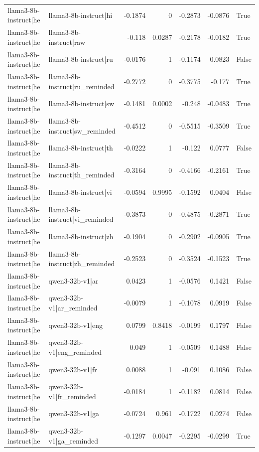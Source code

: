 \begin{table}
\begin{tabular}{l l r r r r l}
llama3-8b-instruct|he & llama3-8b-instruct|hi & -0.1874 & 0 & -0.2873 & -0.0876 & True \\
llama3-8b-instruct|he & llama3-8b-instruct|raw & -0.118 & 0.0287 & -0.2178 & -0.0182 & True \\
llama3-8b-instruct|he & llama3-8b-instruct|ru & -0.0176 & 1 & -0.1174 & 0.0823 & False \\
llama3-8b-instruct|he & llama3-8b-instruct|ru_reminded & -0.2772 & 0 & -0.3775 & -0.177 & True \\
llama3-8b-instruct|he & llama3-8b-instruct|sw & -0.1481 & 0.0002 & -0.248 & -0.0483 & True \\
llama3-8b-instruct|he & llama3-8b-instruct|sw_reminded & -0.4512 & 0 & -0.5515 & -0.3509 & True \\
llama3-8b-instruct|he & llama3-8b-instruct|th & -0.0222 & 1 & -0.122 & 0.0777 & False \\
llama3-8b-instruct|he & llama3-8b-instruct|th_reminded & -0.3164 & 0 & -0.4166 & -0.2161 & True \\
llama3-8b-instruct|he & llama3-8b-instruct|vi & -0.0594 & 0.9995 & -0.1592 & 0.0404 & False \\
llama3-8b-instruct|he & llama3-8b-instruct|vi_reminded & -0.3873 & 0 & -0.4875 & -0.2871 & True \\
llama3-8b-instruct|he & llama3-8b-instruct|zh & -0.1904 & 0 & -0.2902 & -0.0905 & True \\
llama3-8b-instruct|he & llama3-8b-instruct|zh_reminded & -0.2523 & 0 & -0.3524 & -0.1523 & True \\
llama3-8b-instruct|he & qwen3-32b-v1|ar & 0.0423 & 1 & -0.0576 & 0.1421 & False \\
llama3-8b-instruct|he & qwen3-32b-v1|ar_reminded & -0.0079 & 1 & -0.1078 & 0.0919 & False \\
llama3-8b-instruct|he & qwen3-32b-v1|eng & 0.0799 & 0.8418 & -0.0199 & 0.1797 & False \\
llama3-8b-instruct|he & qwen3-32b-v1|eng_reminded & 0.049 & 1 & -0.0509 & 0.1488 & False \\
llama3-8b-instruct|he & qwen3-32b-v1|fr & 0.0088 & 1 & -0.091 & 0.1086 & False \\
llama3-8b-instruct|he & qwen3-32b-v1|fr_reminded & -0.0184 & 1 & -0.1182 & 0.0814 & False \\
llama3-8b-instruct|he & qwen3-32b-v1|ga & -0.0724 & 0.961 & -0.1722 & 0.0274 & False \\
llama3-8b-instruct|he & qwen3-32b-v1|ga_reminded & -0.1297 & 0.0047 & -0.2295 & -0.0299 & True \\

\end{tabular}
\end{table}

